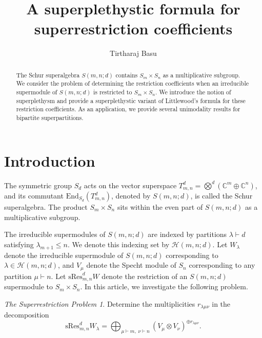 \documentclass[12pt,reqno]{amsart}
\title[superrestriction coefficients]{A superplethystic formula for\\superrestriction 
coefficients}
\author{Tirtharaj Basu}
\theoremstyle{definition}
\newtheorem{question}[theorem]{Question}
\theoremstyle{remark}
\newtheorem*{problem*}{The Superrestriction Problem}
\newcommand{\T}{T_{m,n}^{d}}
\newcommand{\Hi}{\mathcal{H}(m,n;d)}
\newcommand{\res}{\mathrm{sRes}_{m,n}^{d}}
\begin{document}
\begin{abstract}
    The Schur superalgebra $S(m,n;d)$ contains $S_{m}\times S_{n}$ as a multiplicative subgroup. We consider the problem of determining the restriction coefficients when an irreducible supermodule of $S(m,n;d)$ is restricted to $S_{m}\times S_{n}$. We introduce the notion of superplethysm and provide a superplethystic variant of Littlewood's formula for these restriction coefficients. As an application, we provide several unimodality results for bipartite superpartitions.
\end{abstract}
\maketitle
\section{Introduction}
The symmetric group $S_{d}$ acts on the vector superspace $\T=\bigotimes^{d}(\mathbb{C}^{m}\oplus\mathbb{C}^{n})$, and its commutant $\text{End}_{S_{d}}(\T)$, denoted by $S(m,n;d)$, is called the Schur superalgebra. The product $S_{m}\times S_{n}$ sits within the even part of $S(m,n;d)$ as a multiplicative subgroup. 

The irreducible supermodules of $S(m,n;d)$ are indexed by partitions $\lambda\vdash d$ satisfying $\lambda_{m+1}\leq n$. We denote this indexing set by $\Hi$. Let $W_{\lambda}$ denote the irreducible supermodule of $S(m,n;d)$ corresponding to $\lambda\in\Hi$, and $V_{\mu}$ denote the Specht module of $S_n$ corresponding to any partition $\mu\vdash n$.
Let $\res W$ denote the restriction of an $S(m,n;d)$ supermodule to $S_m\times S_n$. In this article, we investigate the following problem.

\begin{problem*}
    Determine the multiplicities $r_{\lambda\mu\nu}$ in the decomposition
    \begin{displaymath}
        \res W_\lambda = \bigoplus_{\mu\vdash m,\;\nu\vdash n} (V_\mu\otimes V_\nu)^{\oplus r_{\lambda\mu\nu}}.
    \end{displaymath}
\end{problem*}

\end{document}

